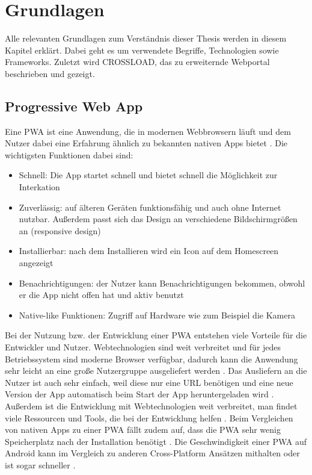\chapter{Grundlagen}
\label{Kap2}

Alle relevanten Grundlagen zum Verständnis dieser Thesis werden in diesem Kapitel erklärt. Dabei geht es um verwendete Begriffe, Technologien sowie Frameworks. Zuletzt wird CROSSLOAD, das zu erweiternde Webportal beschrieben und gezeigt.

\section{Progressive Web App}
Eine \ac{PWA} ist eine Anwendung, die in modernen Webbrowsern läuft und dem Nutzer dabei eine Erfahrung ähnlich zu bekannten nativen Apps bietet \autocite{Sheppard2017} \autocite{Rojas2020}. Die wichtigsten Funktionen dabei sind:

\begin{itemize}
  \item Schnell: Die App startet schnell und bietet schnell die Möglichkeit zur Interkation \autocite{Hajian2019} \autocite{Sheppard2017}
  \item Zuverlässig: auf älteren Geräten funktionsfähig und auch ohne Internet nutzbar. Außerdem passt sich das Design an verschiedene Bildschirmgrößen an (responsive design) \autocite{Hajian2019} \autocite{Sheppard2017}
  \item Installierbar: nach dem Installieren wird ein Icon auf dem Homescreen angezeigt \autocite{Hajian2019} \autocite{Sheppard2017} \autocite{Rojas2020}
  \item Benachrichtigungen: der Nutzer kann Benachrichtigungen bekommen, obwohl er die App nicht offen hat und aktiv benutzt \autocite{Hajian2019} \autocite{Sheppard2017} 
  \item Native-like Funktionen: Zugriff auf Hardware wie zum Beispiel die Kamera \autocite{Hajian2019}
\end{itemize}

Bei der Nutzung bzw. der Entwicklung einer \ac{PWA} entstehen viele Vorteile für die Entwickler und Nutzer. Webtechnologien sind weit verbreitet und für jedes Betriebssystem sind moderne Browser verfügbar, dadurch kann die Anwendung sehr leicht an eine große Nutzergruppe ausgeliefert werden \autocite{Rojas2020}. Das Ausliefern an die Nutzer ist auch sehr einfach, weil diese nur eine URL benötigen \autocite{KHAN2019289} und eine neue Version der App automatisch beim Start der App heruntergeladen wird \autocite{Rojas2020}. Außerdem ist die Entwicklung mit Webtechnologien weit verbreitet, man findet viele Ressourcen und Tools, die bei der Entwicklung helfen \autocite{Rojas2020}. Beim Vergleichen von nativen Apps zu einer \ac{PWA} fällt zudem auf, dass die \ac{PWA} sehr wenig Speicherplatz nach der Installation benötigt \autocite{biorn2017} \autocite{KHAN2019289}. Die Geschwindigkeit einer \ac{PWA} auf Android kann im Vergleich zu anderen Cross-Platform Ansätzen mithalten oder ist sogar schneller \autocite{biorn2017}.

